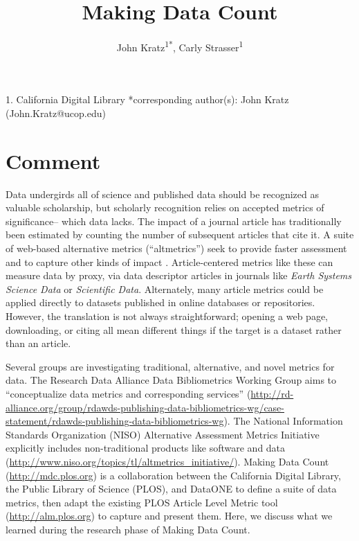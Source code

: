 \documentclass[english]{article}
\begin{document}
\title{Making Data Count}
\author{John Kratz\textsuperscript{1{*}}, Carly Strasser\textsuperscript{1}}

\maketitle
\thispagestyle{fancy}

1. California Digital Library 
{*}corresponding author(s): John Kratz (John.Kratz@ucop.edu)


\section*{Comment}


Data undergirds all of science and published data should be recognized as valuable scholarship, but scholarly recognition relies on accepted metrics of significance-- which data lacks.
The impact of a journal article has traditionally been estimated by counting the number of subsequent articles that cite it. 
A suite of web-based alternative metrics (``altmetrics'') seek to provide faster assessment and to capture other kinds of impact \cite{priem_altmetrics_2012}.
Article-centered metrics like these can measure data by proxy, via data descriptor articles in journals like \textit{Earth Systems Science Data} or \textit{Scientific Data}\cite{pfeiffenberger_earth_2011, editors_more_2014}.
Alternately, many article metrics could be applied directly to datasets published in online databases or repositories.
However, the translation is not always straightforward; opening a web page, downloading, or citing all mean different things if the target is a dataset rather than an article.

Several groups are investigating traditional, alternative, and novel metrics for data. 
The Research Data Alliance Data Bibliometrics Working Group aims to ``conceptualize data metrics and corresponding services'' (\url{http://rd-alliance.org/group/rdawds-publishing-data-bibliometrics-wg/case-statement/rdawds-publishing-data-bibliometrics-wg}{}). 
The National Information Standards Organization (NISO) Alternative Assessment Metrics Initiative explicitly includes non-traditional products like software and data (\url{http://www.niso.org/topics/tl/altmetrics_initiative/}).  
Making Data Count (\url{http://mdc.plos.org}) is a collaboration between the California Digital Library, the Public Library of Science (PLOS), and DataONE to define a suite of data metrics, then adapt the existing PLOS Article Level Metric tool (\url{http://alm.plos.org}) to capture and present them.
Here, we discuss what we learned during the research phase of Making Data Count.
\end{document}
